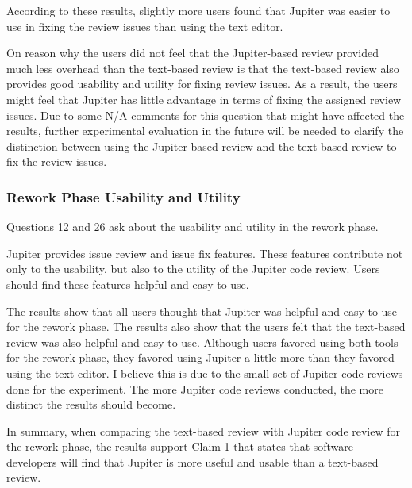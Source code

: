 According to these results, slightly more users found that Jupiter was easier to use in fixing the review issues than using the text editor.

On reason why the users did not feel that the Jupiter-based review provided much less overhead than the text-based review is that the text-based review also provides good usability and utility for fixing review issues. As a result, the users might feel that Jupiter has little advantage in terms of fixing the assigned review issues. Due to some N/A comments for this question that might have affected the results, further experimental evaluation in the future will be needed to clarify the distinction between using the Jupiter-based review and the text-based review to fix the review issues.

\subsubsection{Rework Phase Usability and Utility}
\label{subsubsec:rework-phase-usability-and-utility}

Questions 12 and 26 ask about the usability and utility in the rework phase.
 
Jupiter provides issue review and issue fix features. These features contribute not only to the usability, but also to the utility of the Jupiter code review. Users should find these features helpful and easy to use.

The results show that all users thought that Jupiter was helpful and easy to use for the rework phase. The results also show that the users felt that the text-based review was also helpful and easy to use. Although users favored using both tools for the rework phase, they favored using Jupiter a little more than they favored using the text editor. I believe this is due to the small set of Jupiter code reviews done for the experiment. The more Jupiter code reviews conducted, the more distinct the results should become.

In summary, when comparing the text-based review with Jupiter code review for the rework phase, the results support Claim 1 that states that software developers will find that Jupiter is more useful and usable than a text-based review.

